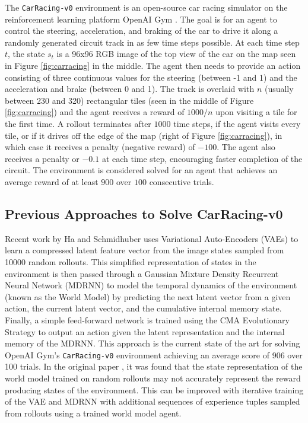 The \texttt{CarRacing-v0} environment is an open-source car racing simulator on the reinforcement learning platform OpenAI Gym \cite{0.0}. The goal is for an agent to control the steering, acceleration, and braking of the car to drive it along a randomly generated circuit track in as few time steps possible. At each time step $t$, the state $s_t$ is a 96x96 RGB image of the top view of the car on the map seen in Figure \ref{fig:carracing} in the middle. The agent then needs to provide an action consisting of three continuous values for the steering (between -1 and 1) and the acceleration and brake (between 0 and 1). The track is overlaid with $n$ (usually between 230 and 320) rectangular tiles (seen in the middle of Figure \ref{fig:carracing}) and the agent receives a reward of $1000/n$ upon visiting a tile for the first time. A rollout terminates after $1000$ time steps, if the agent visits every tile, or if it drives off the edge of the map (right of Figure \ref{fig:carracing}), in which case it receives a penalty (negative reward) of $-100$. The agent also receives a penalty or $-0.1$ at each time step, encouraging faster completion of the circuit. The environment is considered solved for an agent that achieves an average reward of at least $900$ over $100$ consecutive trials.

\subsection{Previous Approaches to Solve CarRacing-v0}

Recent work by Ha and Schmidhuber \cite{1.0.0} uses Variational Auto-Encoders (VAEs) to learn a compressed latent feature vector from the image states sampled from 10000 random rollouts. This simplified representation of states in the environment is then passed through a Gaussian Mixture Density Recurrent Neural Network (MDRNN) to model the temporal dynamics of the environment (known as the World Model) by predicting the next latent vector from a given action, the current latent vector, and the cumulative internal memory state. Finally, a simple feed-forward network is trained using the CMA Evolutionary Strategy to output an action given the latent representation and the internal memory of the MDRNN. This approach is the current state of the art for solving OpenAI Gym's \texttt{CarRacing-v0} environment achieving an average score of 906 over 100 trials. In the original paper \cite{1.0.0}, it was found that the state representation of the world model trained on random rollouts may not accurately represent the reward producing states of the environment. This can be improved with iterative training of the VAE and MDRNN with additional sequences of experience tuples sampled from rollouts using a trained world model agent.

